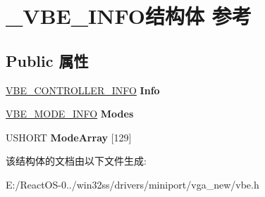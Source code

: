 \hypertarget{struct___v_b_e___i_n_f_o}{}\section{\+\_\+\+V\+B\+E\+\_\+\+I\+N\+F\+O结构体 参考}
\label{struct___v_b_e___i_n_f_o}
\subsection*{Public 属性}
\begin{DoxyCompactItemize}
\item 
\mbox{\label{struct___v_b_e___i_n_f_o_a81a4953288aaf920da5557b3638c9793}} 
\hyperlink{struct___v_b_e___c_o_n_t_r_o_l_l_e_r___i_n_f_o}{V\+B\+E\+\_\+\+C\+O\+N\+T\+R\+O\+L\+L\+E\+R\+\_\+\+I\+N\+FO} {\bfseries Info}
\item 
\mbox{\label{struct___v_b_e___i_n_f_o_a7d36698b0f23555f216249d00b3b0d7c}} 
\hyperlink{struct___v_b_e___m_o_d_e___i_n_f_o}{V\+B\+E\+\_\+\+M\+O\+D\+E\+\_\+\+I\+N\+FO} {\bfseries Modes}
\item 
\mbox{\label{struct___v_b_e___i_n_f_o_afdc2eca6f7fc9e8ab10028aa1026319c}} 
U\+S\+H\+O\+RT {\bfseries Mode\+Array} \mbox{[}129\mbox{]}
\end{DoxyCompactItemize}


该结构体的文档由以下文件生成\+:\begin{DoxyCompactItemize}
\item 
E\+:/\+React\+O\+S-\/0../win32ss/drivers/miniport/vga\+\_\+new/vbe.\+h\end{DoxyCompactItemize}
